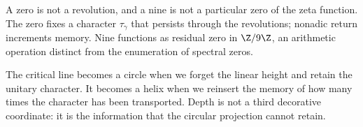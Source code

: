 A zero is not a revolution, and a nine is not a particular zero of the zeta
function. The zero fixes a character \(\tau_\gamma\) that persists through the
revolutions; nonadic return increments memory. Nine functions as residual zero
in \(\Z/9\Z\), an arithmetic operation distinct from the enumeration
of spectral zeros.

\begin{narrativebox}
The critical line becomes a circle when we forget the linear height and
retain the unitary character. It becomes a helix when we reinsert
the memory of how many times the character has been transported. Depth
is not a third decorative coordinate: it is the information that the circular
projection cannot retain.
\end{narrativebox}
